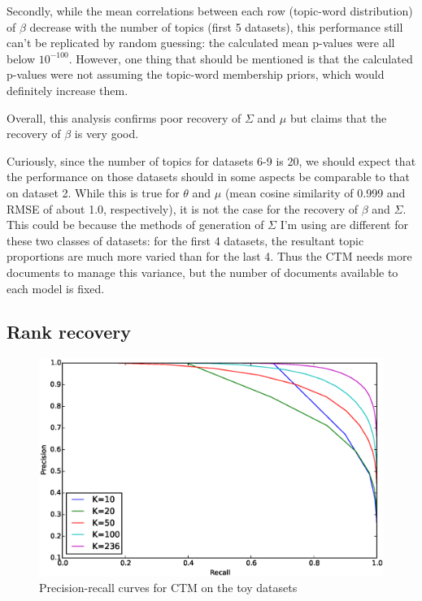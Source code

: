 \documentclass[12pt,a4paper,twoside,openright]{report}
\begin{document}
Secondly, while the mean correlations between each row (topic-word distribution) of $\beta$ decrease with the number of topics (first 5 datasets), this performance still can't be replicated by random guessing: the calculated mean p-values were all below $10^{-100}$. However, one thing that should be mentioned is that the calculated p-values were not assuming the topic-word membership priors, which would definitely increase them.

Overall, this analysis confirms poor recovery of $\Sigma$ and $\mu$ but claims that the recovery of $\beta$ is very good.

Curiously, since the number of topics for datasets 6-9 is 20, we should expect that the performance on those datasets should in some aspects be comparable to that on dataset 2. While this is true for $\theta$ and $\mu$ (mean cosine similarity of 0.999 and RMSE of about 1.0, respectively), it is not the case for the recovery of $\beta$ and $\Sigma$. This could be because the methods of generation of $\Sigma$ I'm using are different for these two classes of datasets: for the first 4 datasets, the resultant topic proportions are much more varied than for the last 4. Thus the CTM needs more documents to manage this variance, but the number of documents available to each model is fixed.

\subsection{Rank recovery}

\begin{figure}[!htb]
\includegraphics[width=\textwidth]{sim-pr-curves-all.eps}
\caption{Precision-recall curves for CTM on the toy datasets}
\label{fig:sim-pr-curves-all}
\end{figure}
\end{document}

